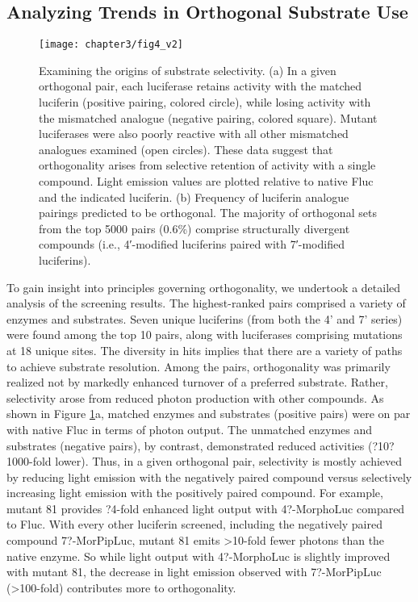 \subsection*{Analyzing Trends in Orthogonal Substrate Use}
\begin{figure}[htb]
\texttt{[image: chapter3/fig4\_v2]}
\centering
\caption[Examining the origins of substrate selectivity]{Examining the origins of substrate selectivity. (a) In a given orthogonal pair, each luciferase retains activity with the matched luciferin (positive pairing, colored circle), while losing activity with the mismatched analogue (negative pairing, colored square). Mutant luciferases were also poorly reactive with all other mismatched analogues examined (open circles). These data suggest that orthogonality arises from selective retention of activity with a single compound. Light emission values are plotted relative to native Fluc and the indicated luciferin. (b) Frequency of luciferin analogue pairings predicted to be orthogonal. The majority of orthogonal sets from the top 5000 pairs (0.6\%{}) comprise structurally divergent compounds (i.e., 4′-modified luciferins paired with 7′-modified luciferins).}
  \label{fig:heatmap}
\end{figure}
To gain insight into principles governing orthogonality, we undertook a detailed analysis of the screening results. The highest-ranked pairs comprised a variety of enzymes and substrates. Seven unique luciferins (from both the 4' and 7' series) were found among the top 10 pairs, along with luciferases comprising mutations at 18 unique sites.
The diversity in hits implies that there are a variety of paths to achieve substrate resolution. Among the pairs, orthogonality was primarily realized not by markedly enhanced turnover of a preferred substrate. Rather, selectivity arose from reduced photon production with other compounds. As shown in Figure \ref{fig:heatmap}a, matched enzymes and substrates (positive pairs) were on par with native Fluc in terms of photon output. The unmatched enzymes and substrates (negative pairs), by contrast, demonstrated reduced activities (?10?1000-fold lower). Thus, in a given orthogonal pair, selectivity is mostly achieved by reducing light emission with the negatively paired compound versus selectively increasing light emission with the positively paired compound. For example, mutant 81 provides ?4-fold enhanced light output with 4?-MorphoLuc compared to Fluc. With every other luciferin screened, including the negatively paired compound 7?-MorPipLuc, mutant 81 emits >10-fold fewer photons than the native enzyme. So while light output with 4?-MorphoLuc is slightly improved with mutant 81, the decrease in light emission observed with 7?-MorPipLuc (>100-fold) contributes more to orthogonality.
